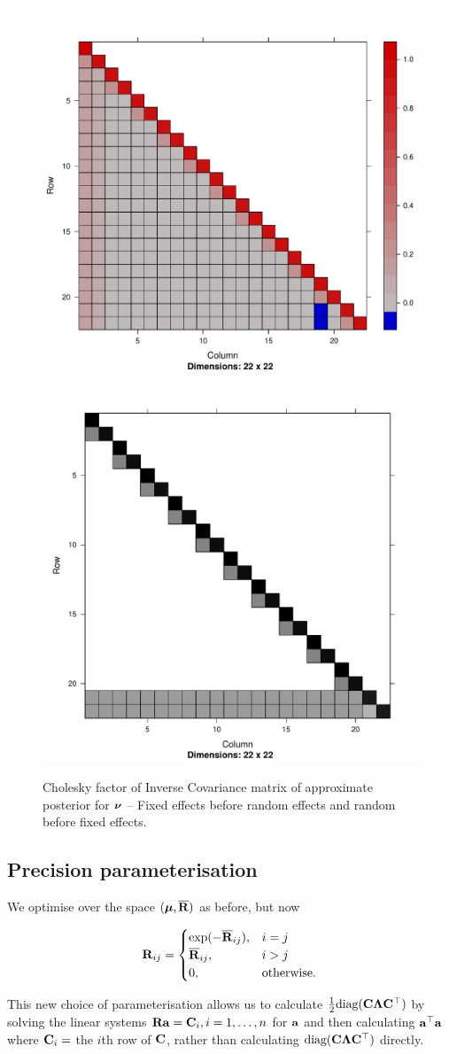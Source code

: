 \begin{figure}[h!]
	\includegraphics[width=0.45 \textwidth]{mX_mZ_cholesky.pdf}
	\includegraphics[width=0.45 \textwidth]{mZ_mX_cholesky.pdf}
	\caption{Cholesky factor of Inverse Covariance matrix of approximate posterior for ${\boldsymbol \nu}$ -- Fixed effects 
						before random effects and random before fixed effects.}
	\label{fig:cholfixedrandom}
\end{figure}

\subsection{Precision parameterisation}

We optimise over the space $({\boldsymbol \mu}, \overline{{\bf R}})$ as before, but now 
		
\begin{equation}
	{\bf R}_{ij} =
	\begin{cases}
		\exp(-\overline{{\bf R}}_{ij}), & i = j             \\
		\overline{{\bf R}}_{ij},        & i > j             \\
		0,                          & \text{otherwise}.
	\end{cases}
\end{equation}
	
\noindent This new choice of parameterisation allows us to calculate $\frac{1}{2} \text{diag}({\bf C} {\boldsymbol \Lambda}
{\bf C}^\top)$ by solving the linear systems ${\bf R} {\bf a} = {\bf C}_{i}, i=1, \ldots, n$ for   ${\bf a}$ and then calculating
${\bf a}^\top{\bf a}$ where ${\bf C}_{i} = $ the $i$th row of ${\bf C}$, rather than calculating $\text{diag}({\bf C} {\boldsymbol \Lambda}
{\bf C}^\top)$ directly.
	
